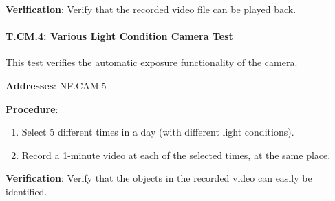 \textbf{Verification}: 
Verify that the recorded video file can be played back.

%

\paragraph{\underline{T.CM.4: Various Light Condition Camera Test}}

This test verifies the automatic exposure functionality of the camera.

\textbf{Addresses}: NF.CAM.5

\textbf{Procedure}:
\begin{enumerate}[noitemsep]
    \item Select 5 different times in a day (with different light conditions).
    \item Record a 1-minute video at each of the selected times, at the same place.
\end{enumerate}

\textbf{Verification}: 
Verify that the objects in the recorded video can easily be identified.